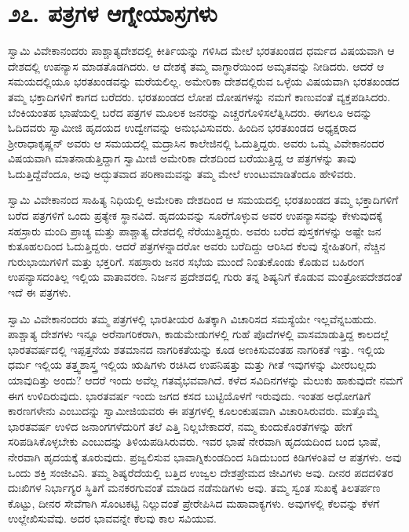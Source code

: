 
\chapter*{೨೭. ಪತ್ರಗಳ ಆಗ್ನೇಯಾಸ್ರಗಳು}

 ಸ್ವಾಮಿ ವಿವೇಕಾನಂದರು ಪಾಶ್ಚಾತ್ಯದೇಶದಲ್ಲಿ ಕೀರ್ತಿಯನ್ನು ಗಳಿಸಿದ ಮೇಲೆ ಭರತಖಂಡದ ಧರ್ಮದ ವಿಷಯವಾಗಿ ಆ ದೇಶದಲ್ಲಿ ಉಪನ್ಯಾಸ ಮಾಡತೊಡಗಿದರು. ಆ ದೇಶಕ್ಕೆ ತಮ್ಮ ವಾಗ್ಧಾರೆಯಿಂದ ಅಮೃತವನ್ನು ನೀಡಿದರು. ಆದರೆ ಆ ಸಮಯದಲ್ಲಿಯೂ ಭರತಖಂಡವನ್ನು ಮರೆಯಲಿಲ್ಲ. ಅಮೇರಿಕಾ ದೇಶದಲ್ಲಿರುವ ಒಳ್ಳೆಯ ವಿಷಯವಾಗಿ ಭರತಖಂಡದ ತಮ್ಮ ಭಕ್ತಾದಿಗಳಿಗೆ ಕಾಗದ ಬರೆದರು. ಭರತಖಂಡದ ಲೋಪ ದೋಷಗಳನ್ನು ನಮಗೆ ಕಾಣುವಂತೆ ವ್ಯಕ್ತಪಡಿಸಿದರು. ಬೆಂಕಿಯಂತಹ ಭಾಷೆಯಲ್ಲಿ ಬರೆದ ಪತ್ರಗಳ ಮೂಲಕ ಜನರನ್ನು ಎಚ್ಚರಗೊಳಿಸಲೆತ್ನಿಸಿದರು. ಈಗಲೂ ಅದನ್ನು ಓದಿದವರು ಸ್ವಾಮೀಜಿ ಹೃದಯದ ಉದ್ವೇಗವನ್ನು ಅನುಭವಿಸುವರು. ಹಿಂದಿನ ಭರತಖಂಡದ ಅಧ್ಯಕ್ಷರಾದ ಶ‍್ರೀ‌ರಾಧಾಕೃಷ್ಣನ್ ಅವರು ಆ ಸಮಯದಲ್ಲಿ ಮದ್ರಾಸಿನ ಕಾಲೇಜಿನಲ್ಲಿ ಓದುತ್ತಿದ್ದರು. ಅವರು ಒಮ್ಮೆ ವಿವೇಕಾನಂದರ ವಿಷಯವಾಗಿ ಮಾತನಾಡುತ್ತಿದ್ದಾಗ ಸ್ವಾಮೀಜಿ ಅಮೇರಿಕಾ ದೇಶದಿಂದ ಬರೆಯುತ್ತಿದ್ದ ಆ ಪತ್ರಗಳನ್ನು ತಾವು ಓದುತ್ತಿದ್ದೆವೆಂದೂ, ಅವು ಅದ್ಭುತವಾದ ಪರಿಣಾಮವನ್ನು ತಮ್ಮ ಮೇಲೆ ಉಂಟುಮಾಡಿತೆಂದೂ ಹೇಳಿವರು. 

 ಸ್ವಾಮಿ ವಿವೇಕಾನಂದ ಸಾಹಿತ್ಯ ನಿಧಿಯಲ್ಲಿ ಅಮೇರಿಕಾ ದೇಶದಿಂದ ಆ ಸಮಯದಲ್ಲಿ ಭರತಖಂಡದ ತಮ್ಮ ಭಕ್ತಾದಿಗಳಿಗೆ ಬರೆದ ಪತ್ರಗಳಿಗೆ ಒಂದು ಪ್ರತ್ಯೇಕ ಸ್ಥಾನವಿದೆ. ಹೃದಯವನ್ನು ಸೂರೆಗೊಳ್ಳುವ ಅವರ ಉಪನ್ಯಾಸವನ್ನು ಕೇಳುವುದಕ್ಕೆ ಸಹಸ್ರಾರು ಮಂದಿ ಪ್ರಾಚ್ಯ ಮತ್ತು ಪಾಶ್ಚಾತ್ಯ ದೇಶದಲ್ಲಿ ನೆರೆಯುತ್ತಿದ್ದರು. ಅವರು ಬರೆದ ಪುಸ್ತಕಗಳನ್ನು ಅಷ್ಟೇ ಜನ ಕುತೂಹಲದಿಂದ ಓದುತ್ತಿದ್ದರು. ಆದರೆ ಪತ್ರಗಳನ್ನಾದರೋ ‌ಅವರು ಬರೆದಿದ್ದು ಆರಿಸಿದ ಕೆಲವು ಸ್ನೇಹಿತರಿಗೆ, ನೆಚ್ಚಿನ ಗುರುಭಾಯಿಗಳಿಗೆ ಮತ್ತು ಭಕ್ತರಿಗೆ. ಸಹಸ್ರಾರು ಜನರ ಸಭೆಯ ಮುಂದೆ ನಿಂತುಕೊಂಡು ಕೊಡುವ ಬಹಿರಂಗ ಉಪನ್ಯಾಸದಂತಿಲ್ಲ ಇಲ್ಲಿಯ ವಾತಾವರಣ. ನಿರ್ಜನ ಪ್ರದೇಶದಲ್ಲಿ ಗುರು ತನ್ನ ಶಿಷ್ಯನಿಗೆ ಕೊಡುವ ಮಂತ್ರೋಪದೇಶದಂತೆ ಇದೆ ಈ ಪತ್ರಗಳು. 

 ಸ್ವಾಮಿ ವಿವೇಕಾನಂದರು ತಮ್ಮ ಪತ್ರಗಳಲ್ಲಿ ಭಾರತೀಯರ ಹಿತಕ್ಕಾಗಿ ವಿಚಾರಿಸದ ಸಮಸ್ಯೆಯೇ ಇಲ್ಲವೆನ್ನಬಹುದು. ಪಾಶ್ಚಾತ್ಯ ದೇಶಗಳು ಇನ್ನೂ ಅರೆನಾಗರಿಕರಾಗಿ, ಕಾಡುಮೇಡುಗಳಲ್ಲಿ ಗುಹೆ ಪೊದೆಗಳಲ್ಲಿ ವಾಸಮಾಡುತ್ತಿದ್ದ ಕಾಲದಲ್ಲೆ ಭಾರತವರ್ಷದಲ್ಲಿ ಇಪ್ಪತ್ತನೆಯ ಶತಮಾನದ ನಾಗರಿಕತೆಯನ್ನು ಕೂಡ ಅಣಕಿಸುವಂತಹ ನಾಗರಿಕತೆ ಇತ್ತು. ಇಲ್ಲಿಯ ಧರ್ಮ ಇಲ್ಲಿಯ ತತ್ತ್ವಶಾಸ್ತ್ರ ಇಲ್ಲಿಯ ಋಷಿಗಳು ರಚಿಸಿದ ಉಪನಿಷತ್ತು ಮತ್ತು ಗೀತೆ ಇವುಗಳನ್ನು ಮೀರಬಲ್ಲದು ಯಾವುದಿತ್ತು ಅಂದು? ಆದರೆ ಇಂದು ಅವೆಲ್ಲ ಗತವೈಭವವಾಗಿದೆ. ಕಳೆದ ಸವಿದಿನಗಳನ್ನು ಮೆಲುಕು ಹಾಕುವುದೇ ನಮಗೆ ಈಗ ಉಳಿದಿರುವುದು. ಭಾರತವರ್ಷ ಇಂದು ಜಗದ ಕಸದ ಬುಟ್ಟಿಯೊಳಗೆ ಇರುವುದು. ಇಂತಹ ಅಧೋಗತಿಗೆ ಕಾರಣಗಳೇನು ಎಂಬುದನ್ನು ಸ್ವಾಮೀಜಿಯವರು ಈ ಪತ್ರಗಳಲ್ಲಿ ಕೂಲಂಕುಷವಾಗಿ ವಿಚಾರಿಸಿರುವರು. ಮತ್ತೊಮ್ಮೆ ಭಾರತವರ್ಷ ಉಳಿದ ಜನಾಂಗಗಳೆದುರಿಗೆ ತಲೆ ಎತ್ತಿ ನಿಲ್ಲಬೇಕಾದರೆ, ನಮ್ಮ ಕುಂದುಕೊರತೆಗಳನ್ನು ಹೇಗೆ ಸರಿಪಡಿಸಿಕೊಳ್ಳಬೇಕು ಎಂಬುದನ್ನು ತಿಳಿಯಪಡಿಸಿರುವರು. ಇವರ ಭಾಷೆ ನೇರವಾಗಿ ಹೃದಯದಿಂದ ಬಂದ ಭಾಷೆ, ನೇರವಾಗಿ ಹೃದಯಕ್ಕೆ ತೂರುವುದು. ಪ್ರಜ್ವಲಿಸುವ ಭಾವಾಗ್ನಿಕುಂಡದಿಂದ ಸಿಡಿದುಬಂದ ಕಿಡಿಗಳಂತಿವೆ ಆ ಪತ್ರಗಳು. ಅವು ಒಂದು ಶಕ್ತಿ ಸಂಜೀವಿನಿ. ತಮ್ಮ ಶಿಷ್ಯರೆದೆಯಲ್ಲಿ ಬತ್ತಿದ ಉಜ್ವಲ ದೇಶಪ್ರೇಮದ ಜೀವಿಗಳು ಅವು. ದೀನರ ಪದದಳಿತರ ದುಃಖಿಗಳ ನಿರ್ಭಾಗ್ಯರ ಸ್ಥಿತಿಗೆ ಮನಕರಗುವಂತೆ ಮಾಡಿದ ನಡೆನುಡಿಗಳು ಅವು. ತಮ್ಮ ಸ್ವಂತ ಸುಖಕ್ಕೆ ತಿಲತರ್ಪಣ ಕೊಟ್ಟು, ದೀನರ ಸೇವೆಗಾಗಿ ಸೊಂಟಕಟ್ಟಿ ನಿಲ್ಲುವಂತೆ ಪ್ರೇರೇಪಿಸಿದ ಮಹಾವಾಕ್ಯಗಳು. ಅವುಗಳಲ್ಲಿ ಕೆಲವನ್ನು ಕೆಳಗೆ ಉಲ್ಲೇಖಿಸುವೆವು. ಅದರ ಭಾವವನ್ನೇ ಕೆಲವು ಕಾಲ ಸವಿಯುವ. 

